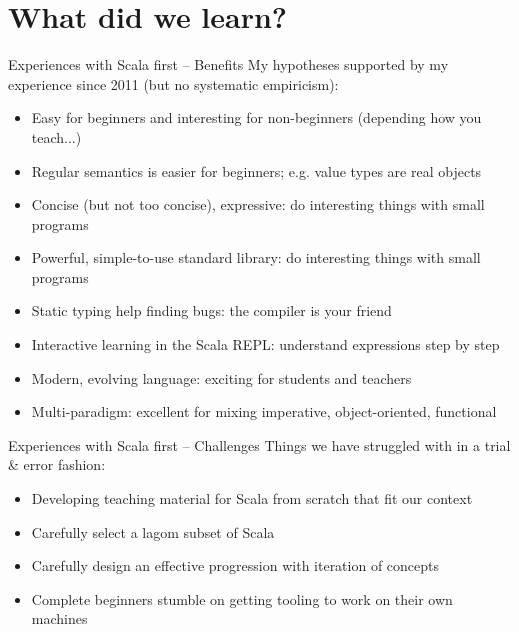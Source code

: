 \documentclass[aspectratio=169]{beamer}
\newcommand{\Section}[1]{\titleimagecolor{red}\section{#1}}
\newenvironment{Slide}[1]%
  {\begin{frame}[environment=Slide]{#1}}
  {\end{frame}}%
\begin{document}
\Section{What did we learn?}


\begin{Slide}{Experiences with Scala first -- Benefits}
  My hypotheses supported by my experience since 2011 (but no systematic empiricism):
  \begin{itemize}
  \item Easy for beginners and interesting for non-beginners (depending how you teach...)
  \item Regular semantics is easier for beginners; e.g. value types are real objects
  \item Concise (but not too concise), expressive: do interesting things with small programs
  \item Powerful, simple-to-use standard library: do interesting things with small programs
  \item Static typing help finding bugs: the compiler is your friend
  \item Interactive learning in the Scala REPL: understand expressions step by step
  \item Modern, evolving language: exciting for students and teachers
  \item Multi-paradigm: excellent for mixing imperative, object-oriented, functional
  \end{itemize}  
\end{Slide}

\begin{Slide}{Experiences with Scala first -- Challenges}
  Things we have struggled with in a trial \& error fashion:
  \begin{itemize}
  \item Developing teaching material for Scala from scratch that fit our context 
  \item Carefully select a lagom subset of Scala
  \item Carefully design an effective progression with iteration of concepts
  \item Complete beginners stumble on getting tooling to work on their own machines
  \end{itemize}  
\end{Slide}
\end{document}
